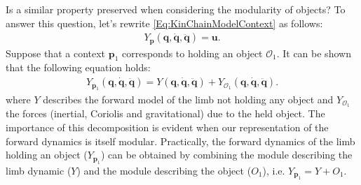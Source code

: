 \documentclass{svmult}
\begin{document}
Is a similar property preserved when considering the modularity of objects?
To answer this question, let's rewrite \eqref{Eq:KinChainModelContext} as follows:
\begin{eqnarray} \label{Eq:DynMod}
Y_{\mathbf p}(\mathbf q, \dot{\mathbf q}, \ddot{\mathbf q}) =
\mathbf u.
\end{eqnarray}
Suppose that a context $\mathbf p_1$ corresponds to holding an object $\mathcal O_1$.
It can be shown that \cite{Kozlowski} the following equation holds:
\begin{eqnarray} \label{Eq:DynMod)}
Y_{\mathbf p_1}(\mathbf q, \dot{\mathbf q}, \ddot{\mathbf q}) =
Y(\mathbf q, \dot{\mathbf q}, \ddot{\mathbf q}) + 
Y_{\mathcal O_1}(\mathbf q, \dot{\mathbf q}, \ddot{\mathbf q}).
\end{eqnarray}
where $Y$ describes the forward model of the limb not holding any object
and $Y_{\mathcal O_1}$ the forces (inertial, Coriolis and gravitational)
due to the held object. The importance of this decomposition is 
evident when our representation of the forward dynamics is itself
modular. Practically, the forward dynamics of the limb holding an 
object ($Y_{\mathbf p_1}$) can be obtained by combining the module 
describing the limb dynamic ($Y$) and the module describing 
the object ($O_1$), i.e. $Y_{\mathbf p_1} = Y + O_1$.
\end{document}
